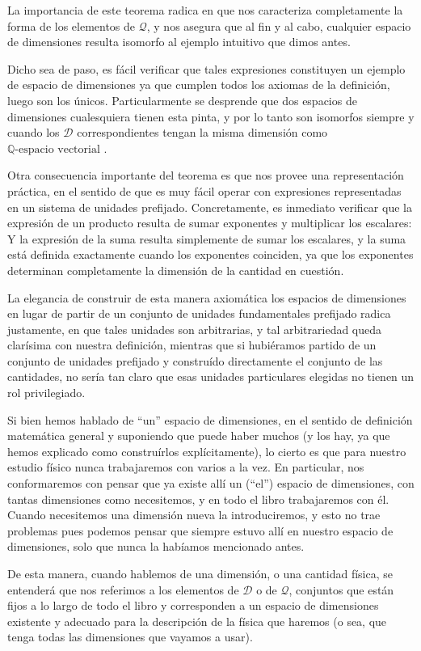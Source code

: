 \documentclass{article}
\def\qev{$\mathbb{Q} \mbox{-espacio vectorial } $}
\def\Dimensions{\mathcal D}
\def\Quantities{\mathcal Q}
\begin{document}
La importancia de este teorema radica en que nos caracteriza completamente la forma de los elementos de $\Quantities$, y
nos asegura que al fin y al cabo, cualquier espacio de dimensiones resulta isomorfo al ejemplo intuitivo que dimos antes.

Dicho sea de paso, es fácil verificar que tales expresiones constituyen un ejemplo de espacio de dimensiones ya que cumplen
todos los axiomas de la definición, luego son los únicos. Particularmente se desprende que dos espacios de dimensiones cualesquiera
tienen esta pinta, y por lo tanto son isomorfos siempre y cuando los $\Dimensions$ correspondientes tengan la misma dimensión
como \qev.

Otra consecuencia importante del teorema es que nos provee una representación práctica, en el sentido de que es muy fácil operar
con expresiones representadas en un sistema de unidades prefijado. Concretamente, es inmediato verificar que la expresión de
un producto resulta de sumar exponentes y multiplicar los escalares: Y la expresión de la suma resulta simplemente de sumar
los escalares, y la suma está definida exactamente cuando los exponentes coinciden, ya que los exponentes determinan completamente
la dimensión de la cantidad en cuestión.

La elegancia de construir de esta manera axiomática los espacios de dimensiones en lugar de partir de un conjunto de unidades
fundamentales prefijado radica justamente, en que tales unidades son arbitrarias, y tal arbitrariedad queda clarísima con
nuestra definición, mientras que si hubiéramos partido de un conjunto de unidades prefijado y construído directamente
el conjunto de las cantidades, no sería tan claro que esas unidades particulares elegidas no tienen un rol privilegiado.

Si bien hemos hablado de ``un'' espacio de dimensiones, en el sentido de definición matemática general y suponiendo que puede haber
muchos (y los hay, ya que hemos explicado como construírlos explícitamente), lo cierto es que para nuestro estudio físico nunca
trabajaremos con varios a la vez. En particular, nos conformaremos con pensar que ya existe allí un (``el'') espacio de dimensiones, con
tantas dimensiones como necesitemos, y en todo el libro trabajaremos con él. Cuando necesitemos una dimensión nueva la introduciremos,
y esto no trae problemas pues podemos pensar que siempre estuvo allí en nuestro espacio de dimensiones, solo que nunca la habíamos
mencionado antes.

De esta manera, cuando hablemos de una dimensión, o una cantidad física, se entenderá que nos referimos a los elementos de
$\Dimensions$ o de $\Quantities$, conjuntos que están fijos a lo largo de todo el libro y corresponden a un espacio de dimensiones
existente y adecuado para la descripción de la física que haremos (o sea, que tenga todas las dimensiones que vayamos a usar).
\end{document}
